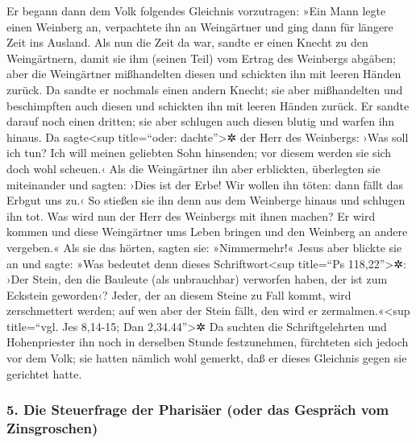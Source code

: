  Er begann dann dem Volk folgendes Gleichnis vorzutragen:
»Ein Mann legte einen Weinberg an, verpachtete ihn an Weingärtner und
ging dann für längere Zeit ins Ausland.  Als nun die Zeit
da war, sandte er einen Knecht zu den Weingärtnern, damit sie ihm
(seinen Teil) vom Ertrag des Weinbergs abgäben; aber die Weingärtner
mißhandelten diesen und schickten ihn mit leeren Händen zurück.
 Da sandte er nochmals einen andern Knecht; sie aber
mißhandelten und beschimpften auch diesen und schickten ihn mit leeren
Händen zurück.  Er sandte darauf noch einen dritten; sie
aber schlugen auch diesen blutig und warfen ihn hinaus. 
Da sagte\textless sup title=``oder: dachte''\textgreater✲ der Herr des
Weinbergs: ›Was soll ich tun? Ich will meinen geliebten Sohn hinsenden;
vor diesem werden sie sich doch wohl scheuen.‹  Als die
Weingärtner ihn aber erblickten, überlegten sie miteinander und sagten:
›Dies ist der Erbe! Wir wollen ihn töten: dann fällt das Erbgut uns zu.‹
 So stießen sie ihn denn aus dem Weinberge hinaus und
schlugen ihn tot. Was wird nun der Herr des Weinbergs mit ihnen machen?
 Er wird kommen und diese Weingärtner ums Leben bringen
und den Weinberg an andere vergeben.« Als sie das hörten, sagten sie:
»Nimmermehr!«  Jesus aber blickte sie an und sagte: »Was
bedeutet denn dieses Schriftwort\textless sup title=``Ps
118,22''\textgreater✲: ›Der Stein, den die Bauleute (als unbrauchbar)
verworfen haben, der ist zum Eckstein geworden‹?  Jeder,
der an diesem Steine zu Fall kommt, wird zerschmettert werden; auf wen
aber der Stein fällt, den wird er zermalmen.«\textless sup title=``vgl.
Jes 8,14-15; Dan 2,34.44''\textgreater✲  Da suchten die
Schriftgelehrten und Hohenpriester ihn noch in derselben Stunde
festzunehmen, fürchteten sich jedoch vor dem Volk; sie hatten nämlich
wohl gemerkt, daß er dieses Gleichnis gegen sie gerichtet hatte.

\hypertarget{die-steuerfrage-der-pharisuxe4er-oder-das-gespruxe4ch-vom-zinsgroschen}{%
\subsubsection{5. Die Steuerfrage der Pharisäer (oder das Gespräch vom
Zinsgroschen)}\label{die-steuerfrage-der-pharisuxe4er-oder-das-gespruxe4ch-vom-zinsgroschen}}

